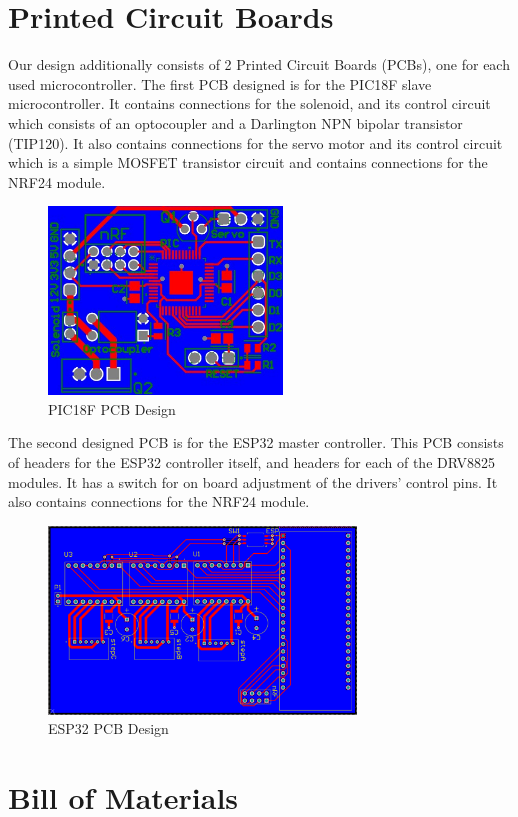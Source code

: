 \section{Printed Circuit Boards}

Our design additionally consists of 2 Printed Circuit Boards (PCBs), one for each used microcontroller. The first PCB designed is for the PIC18F slave microcontroller. It contains connections for the solenoid, and its control circuit which consists of an optocoupler and a Darlington NPN bipolar transistor (TIP120). It also contains connections for the servo motor and its control circuit which is a simple MOSFET transistor circuit and contains connections for the NRF24 module.

\begin{figure}[h]
	\centering\includegraphics[height=5cm]{./images/picpcb}
	\caption{PIC18F PCB Design}
\end{figure}

The second designed PCB is for the ESP32 master controller. This PCB consists of headers for the ESP32 controller itself, and headers for each of the DRV8825 modules. It has a switch for on board adjustment of the drivers' control pins. It also contains connections for the NRF24 module.

\begin{figure}[h]
	\centering\includegraphics[height=5cm]{./images/esppcb}
	\caption{ESP32 PCB Design}
\end{figure}

\section{Bill of Materials}

